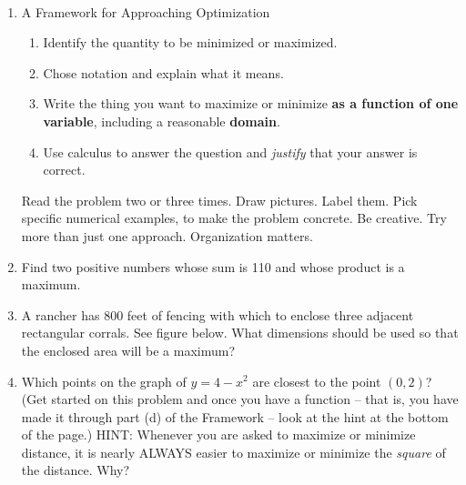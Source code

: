 \documentclass[11pt,fleqn]{article}
\begin{document}
\vspace*{-0.7in}

\begin{center}
  \Large{}\\
\end{center}
\begin{enumerate}
\item A Framework for Approaching Optimization
\begin{enumerate}
\item Identify the quantity to be minimized or maximized.
\item Chose notation and explain what it means.
\item Write the thing you want to maximize or minimize \textbf{as a function of one variable}, including a reasonable \textbf{domain}.
\item Use calculus to answer the question and \emph{justify} that your answer is correct.
\end{enumerate}
Read the problem two or three times. Draw pictures. Label them. Pick specific numerical examples, to make the problem concrete. Be creative. Try more than just one approach. Organization matters.
\item  Find two positive numbers whose sum is 110 and whose product is a maximum.
\vfill
\newpage
\item A rancher has 800 feet of fencing with which to
  enclose three adjacent rectangular corrals. See figure below. What dimensions should
  be used so that the enclosed area will be a maximum?\\
  
\vfill
\item Which points on the graph of $y = 4-x^2$ are
  closest to the point $(0, 2)$? (Get started on this problem and once you have a function -- that is, you have made it through part (d) of the Framework -- look at the hint at the bottom of the page.)
  \vfill
  HINT: Whenever you are asked to maximize or minimize distance, it is nearly ALWAYS easier to maximize or minimize the \emph{square} of the distance. Why? 
\end{enumerate}
\end{document}
